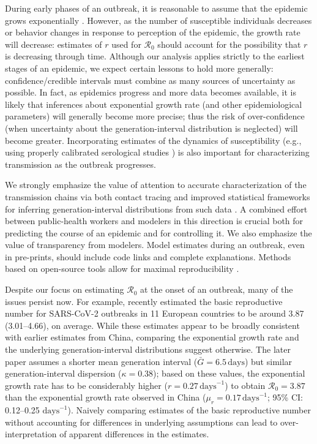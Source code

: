 \documentclass[12pt]{article}
\newcommand{\Ro}{\ensuremath{{\mathcal R}_{0}}\xspace}
\begin{document}
During early phases of an outbreak, it is reasonable to assume that the epidemic grows exponentially \citep{anderson1991infectious}.
However, as the number of susceptible individuals decreases or behavior changes in response to perception of the epidemic, the growth rate will decrease: estimates of $r$ used for \Ro should account for the possibility that $r$ is decreasing through time.
Although our analysis applies strictly to the earliest stages of an epidemic, we expect certain lessons to hold more generally: confidence/credible intervals must combine as many sources of uncertainty as possible. 
In fact, as epidemics progress and more data becomes available, it is likely that inferences about exponential growth rate (and other epidemiological parameters) will generally become more precise; thus the risk of over-confidence (when uncertainty about the generation-interval distribution is neglected) will become greater.
Incorporating estimates of the dynamics of susceptibility (e.g., using properly calibrated serological studies \citep{metcalf2016use}) is also important for characterizing transmission as the outbreak progresses.

We strongly emphasize the value of attention to accurate characterization of the transmission chains via both contact tracing and improved statistical frameworks for inferring generation-interval distributions from such data \citep{britton2019estimation}.
A combined effort between public-health workers and modelers in this direction is crucial both for predicting the course of an epidemic and for controlling it.
We also emphasize the value of transparency from modelers.
Model estimates during an outbreak, even in pre-prints, should include code links and complete explanations.
Methods based on open-source tools allow for maximal reproducibility \citep{barton2020call}.

Despite our focus on estimating \Ro at the onset of an outbreak, many of the issues persist now. 
For example, \cite{flaxman2020estimating} recently estimated the basic reproductive number for SARS-CoV-2 outbreaks in 11 European countries to be around 3.87 (3.01--4.66), on average.
While these estimates appear to be broadly consistent with earlier estimates from China, comparing the exponential growth rate and the underlying generation-interval distributions suggest otherwise.
The later paper assumes a shorter mean generation interval ($\bar G = 6.5\,\textrm{days}$) but similar generation-interval dispersion ($\kappa = 0.38$);
based on these values, the exponential growth rate has to be considerably higher ($r = 0.27\,\textrm{days}^{-1}$) to obtain $\Ro = 3.87$ than the exponential growth rate observed in China ($\mu_r = 0.17\,\textrm{days}^{-1}$; 95\% CI: 0.12--0.25 $\textrm{days}^{-1}$).
Naively comparing estimates of the basic reproductive number without accounting for differences in underlying assumptions can lead to over-interpretation of apparent differences in the estimates.
\end{document}
